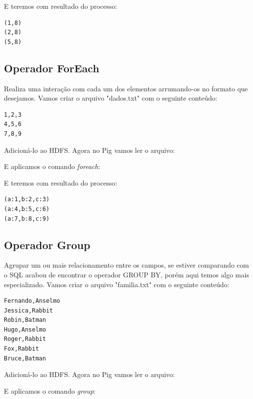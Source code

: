 \documentclass[a4paper,11pt]{article}
\begin{document}
E teremos com resultado do processo:
\begin{lstlisting}[]
(1,8)
(2,8)
(5,8)
\end{lstlisting}

\subsection{Operador ForEach}
Realiza uma interação com cada um dos elementos arrumando-os no formato que desejamos. Vamos criar o arquivo "dados.txt" com o seguinte conteúdo:
\begin{lstlisting}[]
1,2,3
4,5,6
7,8,9
\end{lstlisting}

Adicioná-lo ao HDFS. Agora no Pig vamos ler o arquivo: \\

E aplicamos o comando \textit{foreach}: \\

E teremos com resultado do processo:
\begin{lstlisting}[]
(a:1,b:2,c:3)
(a:4,b:5,c:6)
(a:7,b:8,c:9)
\end{lstlisting}

\subsection{Operador Group}
Agrupar um ou mais relacionamento entre os campos, se estiver comparando com o SQL acabou de encontrar o operador GROUP BY, porém aqui temos algo mais especializado. Vamos criar o arquivo "familia.txt" com o seguinte conteúdo:
\begin{lstlisting}[]
Fernando,Anselmo
Jessica,Rabbit
Robin,Batman
Hugo,Anselmo
Roger,Rabbit
Fox,Rabbit
Bruce,Batman
\end{lstlisting}

Adicioná-lo ao HDFS. Agora no Pig vamos ler o arquivo: \\

E aplicamos o comando \textit{group}: \\
\end{document}
